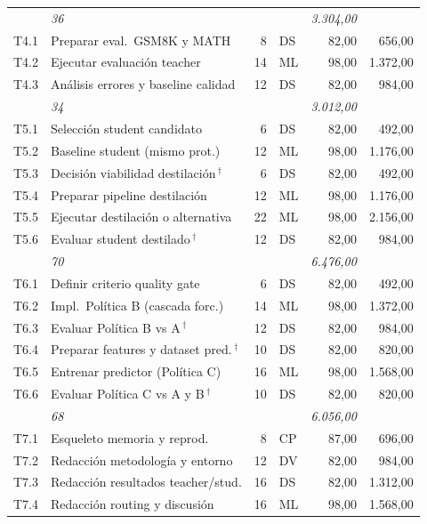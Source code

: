 \documentclass[11pt,a4paper]{article}
\begin{document}
{\begin{tabularx}{\textwidth}{>{\ttfamily}l >{\raggedright\arraybackslash}X r l r r}
\multicolumn{2}{r}{\textit{Subtotal F3}} & \textit{36} & & & \textit{3.304,00} \\
\addlinespace[1.5pt]
T4.1 & Preparar eval.\ GSM8K y MATH & 8 & DS & 82,00 & 656,00 \\
T4.2 & Ejecutar evaluación teacher & 14 & ML & 98,00 & 1.372,00 \\
T4.3 & Análisis errores y baseline calidad & 12 & DS & 82,00 & 984,00 \\
\multicolumn{2}{r}{\textit{Subtotal F4}} & \textit{34} & & & \textit{3.012,00} \\
\addlinespace[1.5pt]
T5.1 & Selección student candidato & 6 & DS & 82,00 & 492,00 \\
T5.2 & Baseline student (mismo prot.) & 12 & ML & 98,00 & 1.176,00 \\
T5.3 & Decisión viabilidad destilación$\,^\dagger$ & 6 & DS & 82,00 & 492,00 \\
T5.4 & Preparar pipeline destilación & 12 & ML & 98,00 & 1.176,00 \\
T5.5 & Ejecutar destilación o alternativa & 22 & ML & 98,00 & 2.156,00 \\
T5.6 & Evaluar student destilado$\,^\dagger$ & 12 & DS & 82,00 & 984,00 \\
\multicolumn{2}{r}{\textit{Subtotal F5}} & \textit{70} & & & \textit{6.476,00} \\
\addlinespace[1.5pt]
T6.1 & Definir criterio quality gate & 6 & DS & 82,00 & 492,00 \\
T6.2 & Impl.\ Política B (cascada forc.) & 14 & ML & 98,00 & 1.372,00 \\
T6.3 & Evaluar Política B vs A$\,^\dagger$ & 12 & DS & 82,00 & 984,00 \\
T6.4 & Preparar features y dataset pred.$\,^\dagger$ & 10 & DS & 82,00 & 820,00 \\
T6.5 & Entrenar predictor (Política C) & 16 & ML & 98,00 & 1.568,00 \\
T6.6 & Evaluar Política C vs A y B$\,^\dagger$ & 10 & DS & 82,00 & 820,00 \\
\multicolumn{2}{r}{\textit{Subtotal F6}} & \textit{68} & & & \textit{6.056,00} \\
\addlinespace[1.5pt]
T7.1 & Esqueleto memoria y reprod. & 8 & CP & 87,00 & 696,00 \\
T7.2 & Redacción metodología y entorno & 12 & DV & 82,00 & 984,00 \\
T7.3 & Redacción resultados teacher/stud. & 16 & DS & 82,00 & 1.312,00 \\
T7.4 & Redacción routing y discusión & 16 & ML & 98,00 & 1.568,00 \\

\end{tabularx}}
\end{document}
